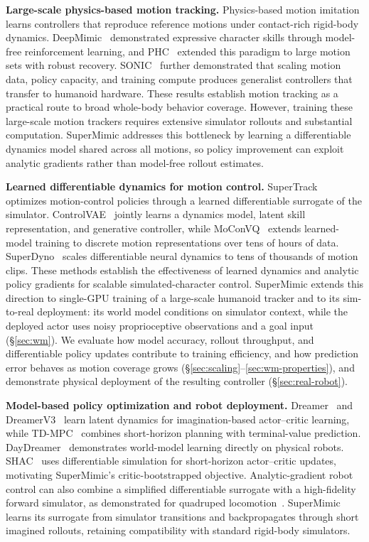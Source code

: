 \textbf{Large-scale physics-based motion tracking.}
Physics-based motion imitation learns controllers that reproduce reference motions under contact-rich rigid-body dynamics.
DeepMimic~\citep{peng2018deepmimic} demonstrated expressive character skills through model-free reinforcement learning, and PHC~\citep{luo2023perpetual} extended this paradigm to large motion sets with robust recovery.
SONIC~\citep{luo2025sonic} further demonstrated that scaling motion data, policy capacity, and training compute produces generalist controllers that transfer to humanoid hardware.
These results establish motion tracking as a practical route to broad whole-body behavior coverage.
However, training these large-scale motion trackers requires extensive simulator rollouts and substantial computation.
SuperMimic addresses this bottleneck by learning a differentiable dynamics model shared across all motions, so policy improvement can exploit analytic gradients rather than model-free rollout estimates.

\textbf{Learned differentiable dynamics for motion control.}
SuperTrack~\citep{fussell2021supertrack} optimizes motion-control policies through a learned differentiable surrogate of the simulator.
ControlVAE~\citep{yao2022controlvae} jointly learns a dynamics model, latent skill representation, and generative controller, while MoConVQ~\citep{yao2024moconvq} extends learned-model training to discrete motion representations over tens of hours of data.
SuperDyno~\citep{lei2025scalable} scales differentiable neural dynamics to tens of thousands of motion clips.
These methods establish the effectiveness of learned dynamics and analytic policy gradients for scalable simulated-character control.
SuperMimic extends this direction to single-GPU training of a large-scale humanoid tracker and to its sim-to-real deployment: its world model conditions on simulator context, while the deployed actor uses noisy proprioceptive observations and a goal input (\S\ref{sec:wm}).
We evaluate how model accuracy, rollout throughput, and differentiable policy updates contribute to training efficiency, and how prediction error behaves as motion coverage grows (\S\ref{sec:scaling}--\ref{sec:wm-properties}), and demonstrate physical deployment of the resulting controller (\S\ref{sec:real-robot}).

\textbf{Model-based policy optimization and robot deployment.}
Dreamer~\citep{hafner2019dream} and DreamerV3~\citep{hafner2025dreamerv3} learn latent dynamics for imagination-based actor--critic learning, while TD-MPC~\citep{hansen2022temporal} combines short-horizon planning with terminal-value prediction.
DayDreamer~\citep{wu2023daydreamer} demonstrates world-model learning directly on physical robots.
SHAC~\citep{xu2022accelerated} uses differentiable simulation for short-horizon actor--critic updates, motivating SuperMimic's critic-bootstrapped objective.
Analytic-gradient robot control can also combine a simplified differentiable surrogate with a high-fidelity forward simulator, as demonstrated for quadruped locomotion~\citep{song2025differentiable}.
SuperMimic learns its surrogate from simulator transitions and backpropagates through short imagined rollouts, retaining compatibility with standard rigid-body simulators.

